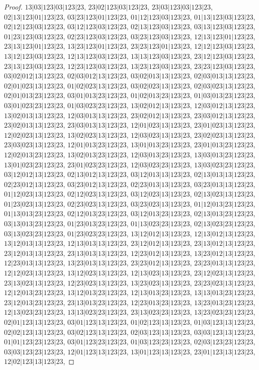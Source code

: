\documentclass[12pt]{article}
\theoremstyle{plain}
\theoremstyle{definition}
\theoremstyle{remark}
\begin{document}
\begin{proof}
$13|03|123|03|123|23$, $23|02|123|03|123|23$, $23|03|123|03|123|23$, $02|13|123|01|123|23$, $03|23|123|01|123|23$, $01|12|123|03|123|23$, $01|13|123|03|123|23$, $02|12|123|03|123|23$, $03|12|123|03|123|23$, $02|13|123|03|123|23$, $03|13|123|03|123|23$, $01|23|123|03|123|23$, $02|23|123|03|123|23$, $03|23|123|03|123|23$, $12|13|123|01|123|23$, $23|13|123|01|123|23$, $13|23|123|01|123|23$, $23|23|123|01|123|23$, $12|12|123|03|123|23$, $13|12|123|03|123|23$, $12|13|123|03|123|23$, $13|13|123|03|123|23$, $23|12|123|03|123|23$, $23|13|123|03|123|23$, $12|23|123|03|123|23$, $13|23|123|03|123|23$, $23|23|123|03|123|23$, $03|02|012|13|123|23$, $02|03|012|13|123|23$, $03|02|013|13|123|23$, $02|03|013|13|123|23$, $02|01|023|13|123|23$, $01|02|023|13|123|23$, $03|02|023|13|123|23$, $02|03|023|13|123|23$, $02|01|013|23|123|23$, $03|01|013|23|123|23$, $01|02|013|23|123|23$, $01|03|013|23|123|23$, $03|01|023|23|123|23$, $01|03|023|23|123|23$, $13|02|012|13|123|23$, $12|03|012|13|123|23$, $13|02|013|13|123|23$, $12|03|013|13|123|23$, $23|02|012|13|123|23$, $23|03|012|13|123|23$, $23|02|013|13|123|23$, $23|03|013|13|123|23$, $12|01|023|13|123|23$, $23|01|023|13|123|23$, $12|02|023|13|123|23$, $13|02|023|13|123|23$, $12|03|023|13|123|23$, $23|02|023|13|123|23$, $23|03|023|13|123|23$, $12|01|013|23|123|23$, $13|01|013|23|123|23$, $23|01|013|23|123|23$, $12|02|013|23|123|23$, $13|02|013|23|123|23$, $12|03|013|23|123|23$, $13|03|013|23|123|23$, $13|01|023|23|123|23$, $23|01|023|23|123|23$, $12|03|023|23|123|23$, $13|03|023|23|123|23$, $03|12|012|13|123|23$, $02|13|012|13|123|23$, $03|12|013|13|123|23$, $02|13|013|13|123|23$, $02|23|012|13|123|23$, $03|23|012|13|123|23$, $02|23|013|13|123|23$, $03|23|013|13|123|23$, $01|12|023|13|123|23$, $02|12|023|13|123|23$, $03|12|023|13|123|23$, $02|13|023|13|123|23$, $01|23|023|13|123|23$, $02|23|023|13|123|23$, $03|23|023|13|123|23$, $01|12|013|23|123|23$, $01|13|013|23|123|23$, $02|12|013|23|123|23$, $03|12|013|23|123|23$, $02|13|013|23|123|23$, $03|13|013|23|123|23$, $01|23|013|23|123|23$, $01|13|023|23|123|23$, $02|13|023|23|123|23$, $03|13|023|23|123|23$, $01|23|023|23|123|23$, $13|12|012|13|123|23$, $12|13|012|13|123|23$, $13|12|013|13|123|23$, $12|13|013|13|123|23$, $23|12|012|13|123|23$, $23|13|012|13|123|23$, $23|12|013|13|123|23$, $23|13|013|13|123|23$, $12|23|012|13|123|23$, $13|23|012|13|123|23$, $12|23|013|13|123|23$, $13|23|013|13|123|23$, $23|23|012|13|123|23$, $23|23|013|13|123|23$, $12|12|023|13|123|23$, $13|12|023|13|123|23$, $12|13|023|13|123|23$, $23|12|023|13|123|23$, $23|13|023|13|123|23$, $12|23|023|13|123|23$, $13|23|023|13|123|23$, $23|23|023|13|123|23$, $12|12|013|23|123|23$, $13|12|013|23|123|23$, $12|13|013|23|123|23$, $13|13|013|23|123|23$, $23|12|013|23|123|23$, $23|13|013|23|123|23$, $12|23|013|23|123|23$, $13|23|013|23|123|23$, $12|13|023|23|123|23$, $13|13|023|23|123|23$, $23|13|023|23|123|23$, $13|23|023|23|123|23$, $02|01|123|13|123|23$, $03|01|123|13|123|23$, $01|02|123|13|123|23$, $01|03|123|13|123|23$, $02|02|123|13|123|23$, $03|02|123|13|123|23$, $02|03|123|13|123|23$, $03|03|123|13|123|23$, $01|01|123|23|123|23$, $03|01|123|23|123|23$, $01|03|123|23|123|23$, $02|03|123|23|123|23$, $03|03|123|23|123|23$, $12|01|123|13|123|23$, $13|01|123|13|123|23$, $23|01|123|13|123|23$, $12|02|123|13|123|23$, 
\end{proof}
\end{document}
